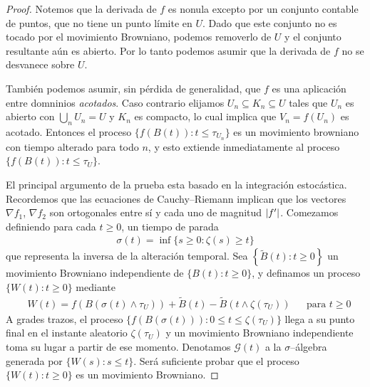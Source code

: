 \documentclass{article}
\newcommand{\brownian}{B}
\newcommand{\alteredBrownian}{\widetilde{\brownian}}
\newcommand{\wiener}{W}
\DeclarePairedDelimiter{\abs}{\lvert}{\rvert}
\theoremstyle{plain}
\theoremstyle{remark}
\theoremstyle{definition}
\begin{document}
\begin{proof}
  Notemos que la derivada de \(f\) es nonula excepto por un conjunto contable de puntos, que no tiene un punto límite en \(U\).
  Dado que este conjunto no es tocado por el movimiento Browniano, podemos removerlo de \(U\) y el conjunto resultante aún es abierto.
  Por lo tanto podemos asumir que la derivada de \(f\) no se desvanece sobre \(U\).

  También podemos asumir, sin pérdida de generalidad, que \(f\) es una aplicación entre domninios \emph{acotados}.
  Caso contrario elijamos \(U_n \subseteq K_n \subseteq U\) tales que \(U_n\) es abierto con \(\bigcup_n U_n = U\) y \(K_n\) es compacto, lo cual implica que \(V_n = f(U_n)\) es acotado.
  Entonces el proceso \(\{f(\brownian(t)) : t \leq \tau_{U_n}\}\) es un movimiento browniano con tiempo alterado para todo \(n\), y esto extiende inmediatamente al proceso \(\{f(\brownian(t)) : t \leq \tau_U\}\).

  El principal argumento de la prueba esta basado en la integración estocástica.
  Recordemos que las ecuaciones de Cauchy--Riemann implican que los vectores \(\nabla f_1\), \(\nabla f_2\) son ortogonales entre sí y cada uno de magnitud \(\abs{f'}\).
  Comezamos definiendo para cada \(t \geq 0\), un tiempo de parada
  \begin{align}
    \sigma(t) = \inf \{s \geq 0 : \zeta(s) \geq t\}
  \end{align}
  que representa la inversa de la alteración temporal.
  Sea \(\left\{ \alteredBrownian(t) : t \geq 0 \right\}\) un movimiento Browniano independiente de \(\{\brownian(t) : t \geq 0\}\), y definamos un proceso \(\{\wiener(t) : t \geq 0\}\) mediante
  \begin{align}
    &\wiener(t)
    =
    f(\brownian(\sigma(t) \wedge \tau_U))
      + \alteredBrownian(t) - \alteredBrownian(t \wedge \zeta(\tau_U))
    &&\text{para } t \geq 0
  \end{align}
  A grades trazos, el proceso \(\{f(\brownian(\sigma(t))) : 0 \leq t \leq \zeta(\tau_U)\}\) llega a su punto final en el instante aleatorio \(\zeta(\tau_U)\) y un movimiento Browniano independiente toma su lugar a partir de ese momento.
  Denotamos \(\mathcal{G}(t)\) a la \(\sigma\)--álgebra generada por \(\{\wiener(s) : s \leq t\}\).
  Será suficiente probar que el proceso \(\{\wiener(t) : t \geq 0\}\) es un movimiento Browniano.
  

\end{proof}
\end{document}
